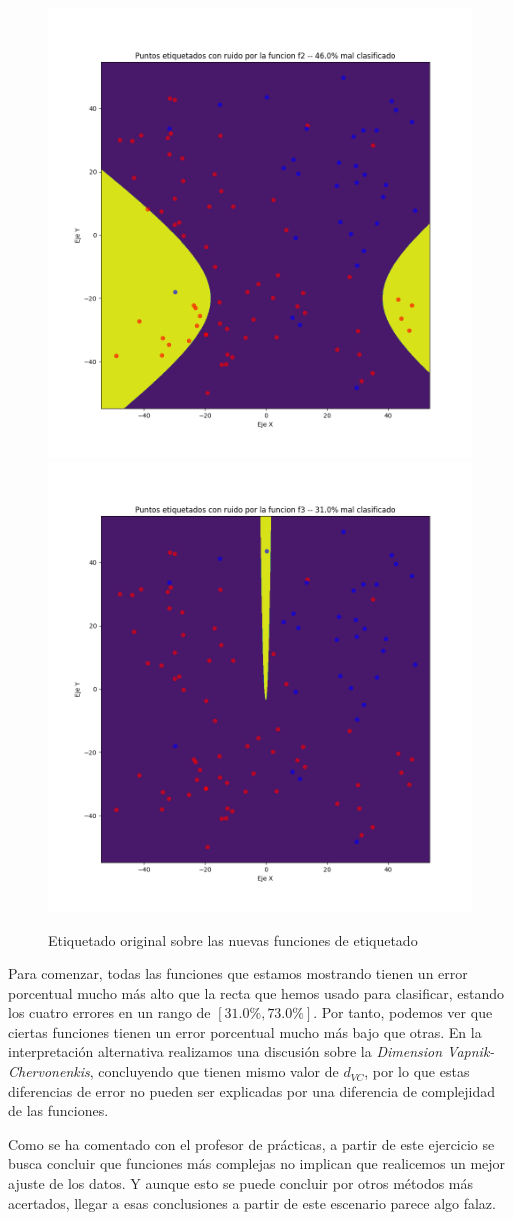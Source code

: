 \documentclass[11pt]{article}
\begin{document}
\begin{figure}[H]
    \includegraphics[width=0.60 \textwidth]{puntos_clasificados_f2.png}
    \includegraphics[width=0.60 \textwidth]{puntos_clasificados_f3.png}

    \caption{Etiquetado original sobre las nuevas funciones de etiquetado}
\end{figure}

Para comenzar, todas las funciones que estamos mostrando tienen un error porcentual mucho más alto que la recta que hemos usado para clasificar, estando los cuatro errores en un rango de $[31.0\%, 73.0\%]$. Por tanto, podemos ver que ciertas funciones tienen un error porcentual mucho más bajo que otras. En la interpretación alternativa realizamos una discusión sobre la \emph{Dimension Vapnik-Chervonenkis}, concluyendo que tienen mismo valor de $d_{VC}$, por lo que estas diferencias de error no pueden ser explicadas por una diferencia de complejidad de las funciones.

Como se ha comentado con el profesor de prácticas, a partir de este ejercicio se busca concluir que funciones más complejas no implican que realicemos un mejor ajuste de los datos. Y aunque esto se puede concluir por otros métodos más acertados, llegar a esas conclusiones a partir de este escenario parece algo falaz.
\end{document}

